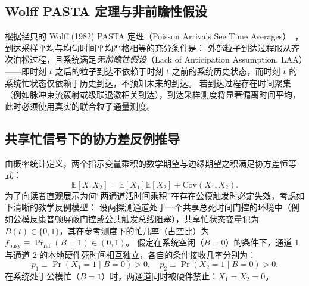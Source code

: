 \subsection{Wolff PASTA 定理与非前瞻性假设}

根据经典的 Wolff (1982) PASTA 定理（Poisson Arrivals See Time Averages）~\cite{wolff-1982-poisson-arrivals-see-time-averages}，到达采样平均与均匀时间平均严格相等的充分条件是：
外部粒子到达过程服从齐次泊松过程，且系统满足\emph{无前瞻性假设}（Lack of Anticipation Assumption, LAA）——即时刻 $t$ 之后的粒子到达不依赖于时刻 $t$ 之前的系统历史状态，而时刻 $t$ 的系统忙状态仅依赖于历史到达，不预知未来的到达。
若到达过程存在时间聚集（例如脉冲束流簇射或级联退激相关到达），到达采样测度将显著偏离时间平均，此时必须使用真实的联合粒子通量测度。

\subsection{共享忙信号下的协方差反例推导}

由概率统计定义，两个指示变量乘积的数学期望与边缘期望之积满足协方差恒等式：
\begin{equation}\label{eq:appE-cov-identity}
\mathbb{E}[X_1 X_2] = \mathbb{E}[X_1] \mathbb{E}[X_2] + \mathrm{Cov}(X_1, X_2).
\end{equation}
为了向读者直观展示为何“两通道活时间乘积”在存在公模触发时必定失效，考虑如下清晰的教学反例模型：
设两探测通道处于一个共享总死时间门控的环境中（例如公模反康普顿屏蔽门控或公共触发总线阻塞），共享忙状态变量记为 $B(t) \in \{0, 1\}$，其在参考测度下的忙几率（占空比）为 $f_{\mathrm{busy}} \equiv \Pr_{\mathrm{ref}}(B = 1) \in (0, 1)$。
假定在系统空闲（$B = 0$）的条件下，通道 1 与通道 2 的本地硬件死时间相互独立，各自的条件接收几率分别为：
$$p_1 \equiv \Pr(X_1 = 1 \mid B = 0) > 0, \quad p_2 \equiv \Pr(X_2 = 1 \mid B = 0) > 0.$$
在系统处于公模忙（$B = 1$）时，两通道同时被硬件禁止：$X_1 = X_2 = 0$。

